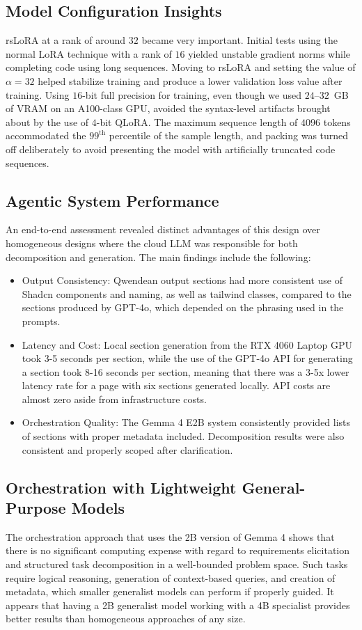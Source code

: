 \documentclass[conference]{IEEEtran}
\begin{document}
\subsection{Model Configuration Insights}
rsLoRA at a rank of around $32$ became very important. Initial tests using the normal LoRA technique with a rank of $16$ yielded unstable gradient norms while completing code using long sequences. Moving to rsLoRA and setting the value of $\alpha = 32$ helped stabilize training and produce a lower validation loss value after training. Using $16$-bit full precision for training, even though we used $24$--$32$~GB of VRAM on an A100-class GPU, avoided the syntax-level artifacts brought about by the use of $4$-bit QLoRA. The maximum sequence length of $4096$ tokens accommodated the $99^{\text{th}}$ percentile of the sample length, and packing was turned off deliberately to avoid presenting the model with artificially truncated code sequences.

\subsection{Agentic System Performance}
An end-to-end assessment revealed distinct advantages of this design over homogeneous designs where the cloud LLM was responsible for both decomposition and generation. The main findings include the following:
\begin{itemize}
    \item Output Consistency: Qwendean output sections had more consistent use of Shadcn components and naming, as well as tailwind classes, compared to the sections produced by GPT-4o, which depended on the phrasing used in the prompts.
    \item Latency and Cost: Local section generation from the RTX 4060 Laptop GPU took 3-5 seconds per section, while the use of the GPT-4o API for generating a section took 8-16 seconds per section, meaning that there was a 3-5x lower latency rate for a page with six sections generated locally. API costs are almost zero aside from infrastructure costs.
    \item Orchestration Quality: The Gemma 4 E2B system consistently provided lists of sections with proper metadata included. Decomposition results were also consistent and properly scoped after clarification.
\end{itemize}

\subsection{Orchestration  
with Lightweight General-Purpose Models}
The orchestration approach that uses the 2B version of Gemma 4 shows that there is no significant computing expense with regard to requirements elicitation and structured task decomposition in a well-bounded problem space. Such tasks require logical reasoning, generation of context-based queries, and creation of metadata, which smaller generalist models can perform if properly guided. It appears that having a 2B generalist model working with a 4B specialist provides better results than homogeneous approaches of any size.
\end{document}

